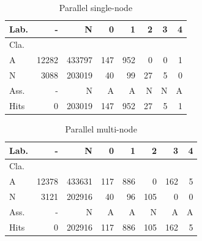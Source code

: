 \begin{table}[hbt]%
{\scriptsize
\setlength\tabcolsep{0.35em}
\begin{center}
\caption{Parallel single-node}
\label{tab:single-node-matrix}
\begin{tabular}{l|r|r|r|r|r|r|r}
  Lab. &      - &       N &    0 &    1 &   2 &  3 &  4 \\\hline
  Cla.  &        &         &      &      &     &    &    \\\hline
  \hline
  A        &  12282 &  433797 &  147 &  952 &   0 &  0 &  1 \\\hline
  N        &   3088 &  203019 &   40 &   99 &  27 &  5 &  0 \\\hline
  \hline
  Ass. &      - &       N &    A &    A &   N &  N &  A \\\hline
  Hits     &      0 &  203019 &  147 &  952 &  27 &  5 &  1 
\end{tabular}
\end{center}
}
\end{table}
% 
% 
\begin{table}[hbt]%
{\scriptsize
\setlength\tabcolsep{0.35em}
\begin{center}
\caption{Parallel multi-node}
\label{tab:multi-node-matrix}
\begin{tabular}{l|r|r|r|r|r|r|r}
  Lab.   &      - &       N &    0 &    1 &    2 &    3 &  4 \\\hline
  Cla.   &        &         &      &      &      &      &    \\\hline
  \hline
  A      &  12378 &  433631 &  117 &  886 &    0 &  162 &  5 \\\hline
  N      &   3121 &  202916 &   40 &   96 &  105 &    0 &  0 \\\hline
  \hline
  Ass.   &      - &       N &    A &    A &    N &    A &  A \\\hline
  Hits   &      0 &  202916 &  117 &  886 &  105 &  162 &  5 
\end{tabular}
\end{center}
}
\end{table}



